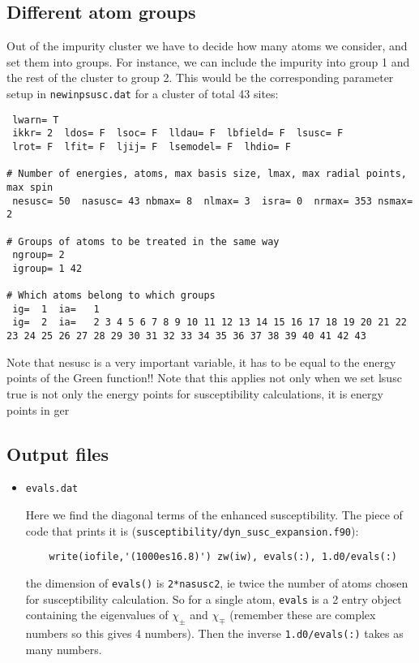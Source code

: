 \documentclass[a4paper,10pt,fullpage]{report}
\begin{document}
\subsection*{Different atom groups}
Out of the impurity cluster we have to decide how many atoms we consider, and set them into groups.
For instance, we can include the impurity into group 1 and the rest of the cluster to group 2.
This would be the corresponding parameter setup in \verb|newinpsusc.dat|
for a cluster of total 43 sites:
\begin{verbatim}
 lwarn= T
 ikkr= 2  ldos= F  lsoc= F  lldau= F  lbfield= F  lsusc= F
 lrot= F  lfit= F  ljij= F  lsemodel= F  lhdio= F

# Number of energies, atoms, max basis size, lmax, max radial points, max spin
 nesusc= 50  nasusc= 43 nbmax= 8  nlmax= 3  isra= 0  nrmax= 353 nsmax= 2

# Groups of atoms to be treated in the same way
 ngroup= 2
 igroup= 1 42

# Which atoms belong to which groups
 ig=  1  ia=   1
 ig=  2  ia=   2 3 4 5 6 7 8 9 10 11 12 13 14 15 16 17 18 19 20 21 22 23 24 25 26 27 28 29 30 31 32 33 34 35 36 37 38 39 40 41 42 43
\end{verbatim}

Note that nesusc is a very important variable, it 
has to be equal to the energy points of the Green function!!
Note that this applies not only when we set lsusc true
is not only the energy points for 
susceptibility calculations, it is energy points in ger

\subsection{Output files}

\begin{itemize}

\item \verb|evals.dat|

Here we find the diagonal terms of the enhanced susceptibility. The piece of code that prints it
is (\verb|susceptibility/dyn_susc_expansion.f90|):
\begin{verbatim}
    write(iofile,'(1000es16.8)') zw(iw), evals(:), 1.d0/evals(:)
\end{verbatim}
the dimension of \verb|evals()| is \verb|2*nasusc2|, ie twice the number of atoms chosen for
susceptibility calculation. So for a single atom,  \verb|evals| is a 2 entry object containing
the eigenvalues of $\chi_{\pm}$ and $\chi_{\mp}$ (remember these are complex numbers so
this gives 4 numbers). Then the inverse \verb|1.d0/evals(:)| takes as many numbers.

\end{itemize}
\end{document}
